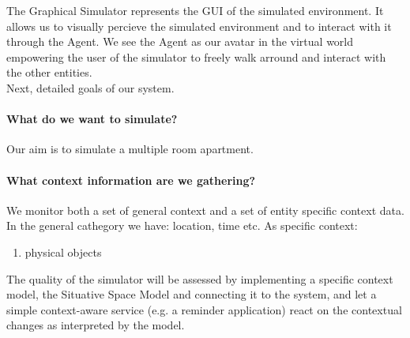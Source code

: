 The Graphical Simulator represents the GUI of the simulated environment. It allows us to visually percieve the simulated environment and to interact with it through the Agent. We see the Agent as our avatar in the virtual world empowering the user of the simulator to freely walk arround and interact with the other entities.\\

Next, detailed goals of our system.

\paragraph{What do we want to simulate?} Our aim is to simulate a multiple room apartment.

\paragraph{What context information are we gathering?} We monitor both a set of general context and a set of entity specific context data. In the general cathegory we have: location, time etc. As specific context:
\begin{enumerate}
	\item physical objects 
\end{enumerate}

The quality of the simulator will be assessed by implementing a specific context model, the Situative Space Model \cite{pederson2011situative} and connecting it to the system, and let a simple context-aware service (e.g. a reminder application) react on the contextual changes as interpreted by the model. \\











